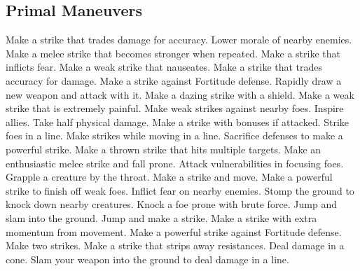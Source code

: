 \subsection{Primal Maneuvers}\label{Primal Maneuvers}
\begin{spelllist}
 Make a strike that trades damage for accuracy.
 Lower morale of nearby enemies.
 Make a melee strike that becomes stronger when repeated.
 Make a strike that inflicts fear.
 Make a weak strike that nauseates.
 Make a strike that trades accuracy for damage.
 Make a strike against Fortitude defense.
 Rapidly draw a new weapon and attack with it.
 Make a dazing strike with a shield.
 Make a weak strike that is extremely painful.
 Make weak strikes against nearby foes.
 Inspire allies.
 Take half physical damage.
 Make a strike with bonuses if attacked.
 Strike foes in a line.
 Make strikes while moving in a line.
 Sacrifice defenses to make a powerful strike.
 Make a thrown strike that hits multiple targets.
 Make an enthusiastic melee strike and fall prone.
 Attack vulnerabilities in focusing foes.
 Grapple a creature by the throat.
 Make a strike and move.
 Make a powerful strike to finish off weak foes.
 Inflict fear on nearby enemies.
 Stomp the ground to knock down nearby creatures.
 Knock a foe prone with brute force.
 Jump and slam into the ground.
 Jump and make a strike.
 Make a strike with extra momentum from movement.
 Make a powerful strike against Fortitude defense.
 Make two strikes.
 Make a strike that strips away resistances.
 Deal damage in a cone.
 Slam your weapon into the ground to deal damage in a line.

\end{spelllist}
